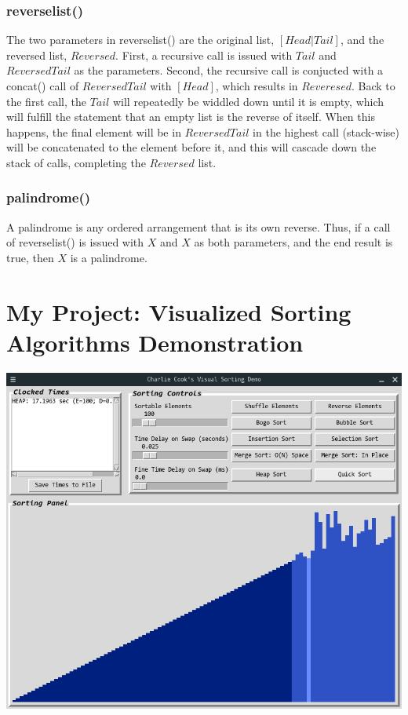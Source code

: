 \documentclass[12pt]{article}
\begin{document}
	\subsubsection{reverselist()}
	The two parameters in reverselist() are the original list, $[Head|Tail]$, and the reversed list, $Reversed$. First, a recursive call is issued with $Tail$ and $ReversedTail$ as the parameters. Second, the recursive call is conjucted with a concat() call of $ReversedTail$ with $[Head]$, which results in $Reveresed$. Back to the first call, the $Tail$ will repeatedly be widdled down until it is empty, which will fulfill the statement that an empty list is the reverse of itself. When this happens, the final element will be in $ReversedTail$ in the highest call (stack-wise) will be concatenated to the element before it, and this will cascade down the stack of calls, completing the $Reversed$ list.

	\subsubsection{palindrome()}
	A palindrome is any ordered arrangement that is its own reverse. Thus, if a call of reverselist() is issued with $X$ and $X$ as both parameters, and the end result is true, then $X$ is a palindrome.
	\pagebreak

	\section{My Project: Visualized Sorting Algorithms Demonstration}
	\Centering
	\includegraphics[width = 0.8\linewidth]{sortingdemo.png}
	\FlushLeft
\end{document}
